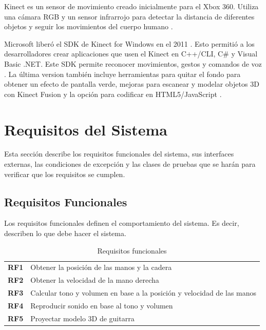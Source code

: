 \documentclass[a4paper,12pt]{article}
\begin{document}
Kinect es un sensor de movimiento creado inicialmente para el Xbox 360.
Utiliza una cámara RGB y un sensor infrarrojo para detectar la distancia de
diferentes objetos y seguir los movimientos del cuerpo humano \cite{kinect_spec}.

Microsoft liberó el SDK de Kinect for Windows en el 2011 \cite{kinect_release}. Esto permitió a los
desarrolladores crear aplicaciones que usen el Kinect en C++/CLI, C\# y
Visual Basic .NET. Este SDK permite reconocer movimientos, gestos y comandos
de voz \cite{sdk}. La última version también incluye herramientas para quitar el fondo
para obtener un efecto de pantalla verde, mejoras para escanear y modelar
objetos 3D con Kinect Fusion y la opción para codificar en HTML5/JavaScript \cite{kinect_new}.

\section{Requisitos del Sistema}
Esta sección describe los requisitos funcionales del sistema, sus interfaces
externas, las condiciones de excepción y las clases de pruebas que se harán
para verificar que los requisitos se cumplen.
\subsection{Requisitos Funcionales}
Los requisitos funcionales definen el comportamiento del sistema. Es decir,
describen lo que debe hacer el sistema.
\begin{table}[h!]
        \centering
        \begin{tabular}{c l}
                \textbf{RF1} & Obtener la posición de las manos y la cadera \\
                \textbf{RF2} & Obtener la velocidad de la mano derecha \\
                \textbf{RF3} & Calcular tono y volumen en base a la posición
                y velocidad de las manos \\
                \textbf{RF4} & Reproducir sonido en base al tono y volumen \\
                \textbf{RF5} & Proyectar modelo 3D de guitarra \\
        \end{tabular}
        \caption{Requisitos funcionales}
        \label{tab:req_func}
\end{table}
\end{document}

